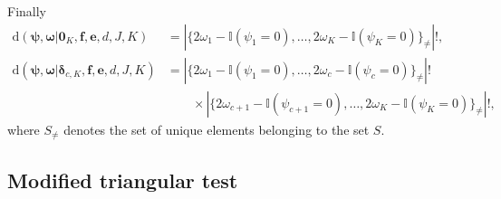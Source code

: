 \documentclass{article}
\numberwithin{equation}{section}
\theoremstyle{plain}
\begin{document}
Finally
\begin{align*}
\text{d}(\boldsymbol{\psi},\boldsymbol{\omega}|\boldsymbol{0}_K,\boldsymbol{f},\boldsymbol{e},d,J,K) &= |\{2\omega_1-\mathbb{I}(\psi_1=0),\dots,2\omega_K-\mathbb{I}(\psi_K=0)\}_{\neq}|!,\\
\text{d}(\boldsymbol{\psi},\boldsymbol{\omega}|\boldsymbol{\delta}_{c,K},\boldsymbol{f},\boldsymbol{e},d,J,K) &= |\{2\omega_1-\mathbb{I}(\psi_1=0),\dots,2\omega_c-\mathbb{I}(\psi_c=0)\}_{\neq}|!\\
& \qquad \times |\{2\omega_{c+1}-\mathbb{I}(\psi_{c+1}=0),\dots,2\omega_K-\mathbb{I}(\psi_K=0)\}_{\neq}|!,
\end{align*}
where $S_{\neq}$ denotes the set of unique elements belonging to the set $S$.

\subsection{Modified triangular test}
\end{document}
